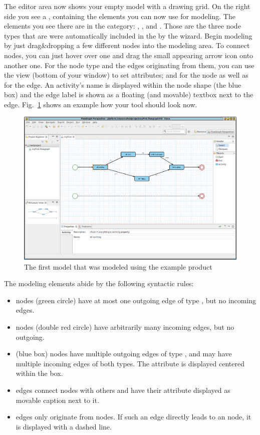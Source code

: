 \documentclass[a4paper,american,12pt]{scrreprt}
\begin{document}
The editor area now shows your empty model with a drawing grid. On the right
side you see a , containing the elements you can now use for modeling.
The elements you see there are in the 
category: , , and . Those are the three node
types that are were automatically included in the  by the
wizard. Begin modeling by just drag\&dropping a few different nodes into the
modeling area. To connect nodes, you can just hover over one and drag the small
appearing arrow icon onto another one. For the  node type and
the edges originating from them, you can use the  view (bottom
of your window) to set attributes;  and  for the
node as well as  for the edge. An activity's name is displayed
within the node shape (the blue box) and the edge label is shown as a floating
(and movable) textbox next to the edge. Fig.~\ref{fig:firstModel} shows an
example how your tool should look now.

\begin{figure}
	\centering
	\includegraphics[width=.9\textwidth]{screenshots/cp-first-model.png} 
	\caption{The first model that was modeled using the example \cinco product}
	\label{fig:firstModel}
\end{figure}

The modeling elements abide by the following syntactic rules:

\begin{itemize}
\item {} nodes (green circle) have at most one outgoing edge of type
	, but no incoming edges.
\item {} nodes (double red circle) have arbitrarily many incoming edges,
	but no outgoing.
\item {} (blue box) nodes have multiple outgoing edges of type
	, and may have multiple incoming edges of both types.
	The attribute  is displayed centered within the box.
\item {} edges connect  nodes with others and
	have their attribute  displayed as movable caption next to it.
\item {} edges only originate from  nodes. If such an
	edge directly leads to an  node, it is displayed with a dashed
	line.
\end{itemize}
\end{document}
